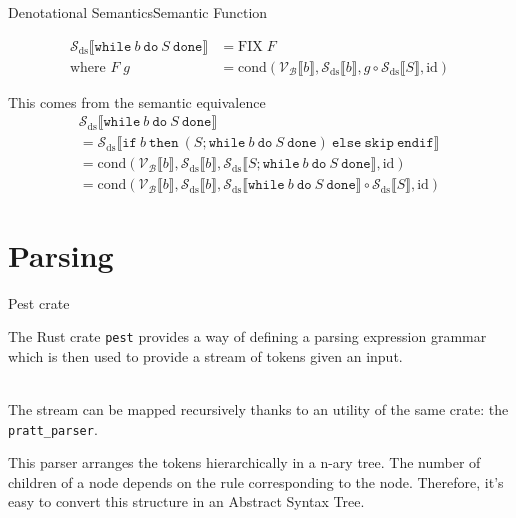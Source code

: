 \documentclass{beamer}
\newcommand{\sskip}{\texttt{skip}}
\newcommand{\ifelse}[3]{\mathtt{if}\ #1\ \mathtt{then}\ #2\ \mathtt{else}\ #3\ \mathtt{endif}}
\newcommand{\while}[2]{\mathtt{while}\ #1\ \mathtt{do}\ #2\ \mathtt{done}}
\newcommand{\sem}[2]{\mathcal{#1} \llbracket #2 \rrbracket}
\begin{document}
\begin{frame}{Denotational Semantics}{Semantic Function}
\begin{overprint}
        \begin{align*}
            \sem{S_{\mathrm{ds}}}{\while{b}{S}} & =
            \mathrm{FIX}\;F                         \\
            \mbox{where } F\;g                  & =
            \mathrm{cond}(\sem{V_B}{b}, \sem{S_\mathrm{ds}}{b}, g \circ \sem{S_{\mathrm{ds}}}{S},\mathrm{id})
        \end{align*}

        This comes from the semantic equivalence
        \begin{multline*}
            \sem{S_{\mathrm{ds}}}{\while{b}{S}} \\
            = \sem{S_{\mathrm{ds}}}{\ifelse{b}{(S; \while{b}{S})}{\sskip}} \\
            = \mathrm{cond}(\sem{V_B}{b}, \sem{S_\mathrm{ds}}{b}, \sem{S_{\mathrm{ds}}}{S; \while{b}{S}},\mathrm{id}) \\
            = \mathrm{cond}(\sem{V_B}{b}, \sem{S_\mathrm{ds}}{b}, \sem{S_{\mathrm{ds}}}{\while{b}{S}} \circ \sem{S_{\mathrm{ds}}}{S},\mathrm{id})
        \end{multline*}
    \end{overprint}

\end{frame}

\section{Parsing}

\begin{frame}{Pest crate}

    The Rust crate \texttt{pest} provides a way of defining a parsing expression grammar which is then used to provide a stream of tokens given an input.

    ~\\
    The stream can be mapped recursively thanks to an utility of the same crate: the \texttt{pratt\_parser}.

    This parser arranges the tokens hierarchically in a n-ary tree.
    The number of children of a node depends on the rule corresponding to the node.
    Therefore, it's easy to convert this structure in an Abstract Syntax Tree.

\end{frame}
\end{document}

